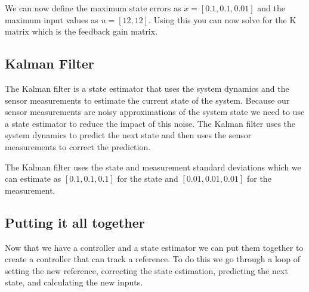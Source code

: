 \documentclass{scrartcl}
\begin{document}
We can now define the maximum state errors as \(x = [0.1, 0.1, 0.01]\) and the maximum input values as \(u = [12, 12]\).
Using this you can now solve for the K matrix which is the feedback gain matrix.

\subsection{Kalman Filter}
The Kalman filter is a state estimator that uses the system dynamics and the sensor measurements to estimate the current state of the system.
Because our sensor measurements are noisy approximations of the system state we need to use a state estimator to reduce the impact of this noise.
The Kalman filter uses the system dynamics to predict the next state and then uses the sensor measurements to correct the prediction.

The Kalman filter uses the state and measurement standard deviations which we can estimate as \([0.1, 0.1, 0.1]\) for the state and \([0.01, 0.01, 0.01]\) for the measurement.

\subsection{Putting it all together}
Now that we have a controller and a state estimator we can put them together to create a controller that can track a reference.
To do this we go through a loop of setting the new reference, correcting the state estimation, predicting the next state, and calculating the new inputs.
\end{document}
